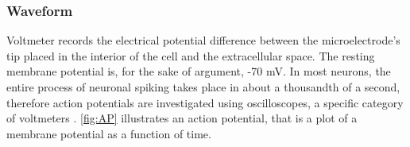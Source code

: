\documentclass[class={myRUCProject}, crop=false]{standalone}
\begin{document}


\subsubsection{Waveform}

Voltmeter records the electrical potential difference between the microelectrode's tip placed in the interior of the cell and the extracellular space. The resting membrane potential is, for the sake of argument, -70 mV. In most neurons, the entire process of neuronal spiking takes place in about a thousandth of a second, therefore action potentials are investigated using oscilloscopes, a specific category of voltmeters \cite{wood1996neuroscience}. \cref{fig:AP} illustrates an action potential, that is a plot of a membrane potential as a function of time. 
\end{document}

